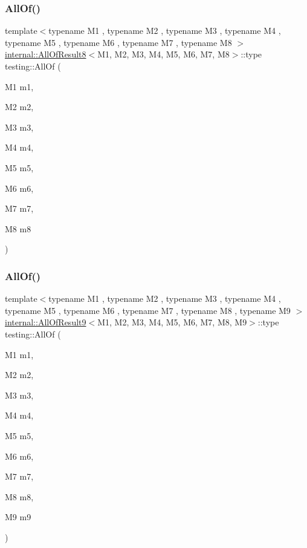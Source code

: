 \mbox{\label{namespacetesting_a7ec0bc4eca9805e85b9b34bbbf3d3ae2}} 
\subsubsection{\texorpdfstring{AllOf()}{AllOf()}\hspace{0.1cm}{\footnotesize\ttfamily [7/9]}}
{\footnotesize\ttfamily template$<$typename M1 , typename M2 , typename M3 , typename M4 , typename M5 , typename M6 , typename M7 , typename M8 $>$ \\
\mbox{\hyperlink{structtesting_1_1internal_1_1_all_of_result8}{internal\+::\+All\+Of\+Result8}}$<$M1, M2, M3, M4, M5, M6, M7, M8$>$\+::type testing\+::\+All\+Of (\begin{DoxyParamCaption}\item[{M1}]{m1,  }\item[{M2}]{m2,  }\item[{M3}]{m3,  }\item[{M4}]{m4,  }\item[{M5}]{m5,  }\item[{M6}]{m6,  }\item[{M7}]{m7,  }\item[{M8}]{m8 }\end{DoxyParamCaption})\hspace{0.3cm}{\ttfamily [inline]}}

\mbox{\label{namespacetesting_aaecf2bd8eb7c68b119f9b81a01942b7f}} 
\subsubsection{\texorpdfstring{AllOf()}{AllOf()}\hspace{0.1cm}{\footnotesize\ttfamily [8/9]}}
{\footnotesize\ttfamily template$<$typename M1 , typename M2 , typename M3 , typename M4 , typename M5 , typename M6 , typename M7 , typename M8 , typename M9 $>$ \\
\mbox{\hyperlink{structtesting_1_1internal_1_1_all_of_result9}{internal\+::\+All\+Of\+Result9}}$<$M1, M2, M3, M4, M5, M6, M7, M8, M9$>$\+::type testing\+::\+All\+Of (\begin{DoxyParamCaption}\item[{M1}]{m1,  }\item[{M2}]{m2,  }\item[{M3}]{m3,  }\item[{M4}]{m4,  }\item[{M5}]{m5,  }\item[{M6}]{m6,  }\item[{M7}]{m7,  }\item[{M8}]{m8,  }\item[{M9}]{m9 }\end{DoxyParamCaption})\hspace{0.3cm}{\ttfamily [inline]}}

